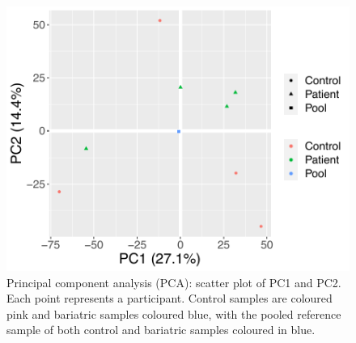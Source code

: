 \documentclass[11pt,twoside]{bristolthesis}
\begin{document}
\begin{figure}
\includegraphics[width=0.95\linewidth]{figure/Bariatric_study/Proteomic_PCA} \caption[Principal component analysis (PCA): scatter plot of PC1 and PC2]{Principal component analysis (PCA): scatter plot of PC1 and PC2. Each point represents a participant. Control samples are coloured pink and bariatric samples coloured blue, with the pooled reference sample of both control and bariatric samples coloured in blue.}\label{fig:pca}
\end{figure}
\end{document}
